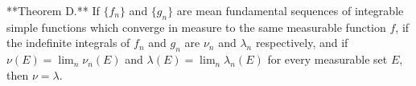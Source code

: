 **Theorem D.** If $\{f_n\}$ and $\{g_n\}$ are mean fundamental sequences of integrable simple functions which converge in measure to the same measurable function $f$, if the indefinite integrals of $f_n$ and $g_n$ are $\nu_n$ and $\lambda_n$ respectively, and if $\nu(E) = \lim_n \nu_n(E)$ and $\lambda(E) = \lim_n \lambda_n(E)$ for every measurable set $E$, then $\nu = \lambda$.
